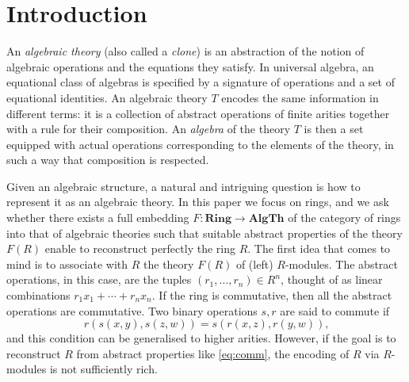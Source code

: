 \documentclass{amsart}
\numberwithin{equation}{section}
\theoremstyle{plain}
\theoremstyle{definition}
\begin{document}
\section{Introduction}
An \emph{algebraic theory} (also called a \emph{clone}) is an abstraction of the notion of algebraic operations and the equations they satisfy.
In universal algebra, an equational class of algebras is specified by a signature of operations and a set of equational identities.
An algebraic theory $T$ encodes the same information in different terms: it is a collection of abstract operations of finite arities together with a rule for their composition.  
An \emph{algebra} of the theory $T$ is then a set equipped with actual operations corresponding to the elements of the theory, in such a way that composition is respected.

Given an algebraic structure, a natural and intriguing question is how to represent it as an algebraic theory.
In this paper we focus on rings, and we ask whether there exists a full embedding $F: \mathbf{Ring} \to \mathbf{AlgTh}$ of the category of rings into that of algebraic theories such that suitable abstract properties of the theory $F(R)$ enable to reconstruct perfectly the ring $R$. 
The first idea that comes to mind is to associate with $R$ the theory $F(R)$ of (left) $R$-modules. 
The abstract operations, in this case, are the tuples $(r_1,\ldots,r_n) \in R^n$, thought of as linear combinations $r_1x_1+\cdots+r_nx_n$. 
If the ring is commutative, then all the abstract operations are commutative.
Two binary operations $s,r$ are said to commute if 
\begin{equation}
  \label{eq:comm}
r(s(x,y),s(z,w)) = s(r(x,z),r(y,w)) \text{,}
\end{equation}
and this condition can be generalised to higher arities. 
However, if the goal is to reconstruct $R$ from abstract properties like \eqref{eq:comm}, the encoding of $R$ via $R$-modules is not sufficiently rich. 
\end{document}
